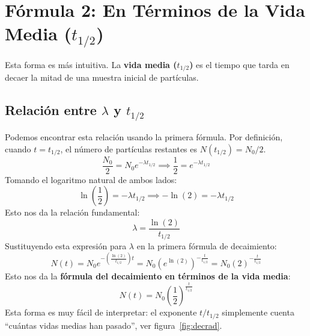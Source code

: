 \documentclass[11pt,a4paper]{book}
\begin{document}
\section*{Fórmula 2: En Términos de la Vida Media ($t_{1/2}$)}

Esta forma es más intuitiva. La \textbf{vida media ($t_{1/2}$)} es el tiempo que tarda en decaer la mitad de una muestra inicial de partículas.

\subsection*{Relación entre $\lambda$ y $t_{1/2}$}
Podemos encontrar esta relación usando la primera fórmula. Por definición, cuando $t = t_{1/2}$, el número de partículas restantes es $N(t_{1/2}) = N_0/2$.
\[ \frac{N_0}{2} = N_0 e^{-\lambda t_{1/2}} \implies \frac{1}{2} = e^{-\lambda t_{1/2}} \]
Tomando el logaritmo natural de ambos lados:
\[ \ln\left(\frac{1}{2}\right) = -\lambda t_{1/2} \implies -\ln(2) = -\lambda t_{1/2} \]
Esto nos da la relación fundamental:
\[ \boxed{\lambda = \frac{\ln(2)}{t_{1/2}}} \]
Sustituyendo esta expresión para $\lambda$ en la primera fórmula de decaimiento:
\[ N(t) = N_0 e^{-\left(\frac{\ln(2)}{t_{1/2}}\right)t} = N_0 \left(e^{\ln(2)}\right)^{-\frac{t}{t_{1/2}}} = N_0 (2)^{-\frac{t}{t_{1/2}}} \]
Esto nos da la \textbf{fórmula del decaimiento en términos de la vida media}:
\[ \boxed{N(t) = N_0 \left(\frac{1}{2}\right)^{\frac{t}{t_{1/2}}}} \]
Esta forma es muy fácil de interpretar: el exponente ${t}/{t_{1/2}}$ simplemente cuenta ``cuántas vidas medias han pasado'', ver figura~\ref{fig:decrad}.
\end{document}

